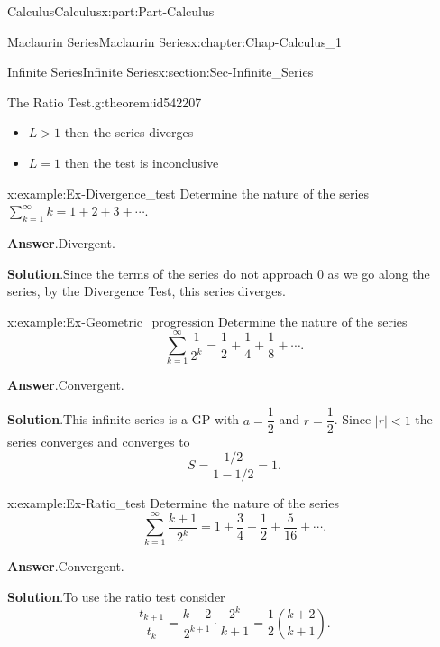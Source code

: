 \documentclass[oneside,10pt,]{book}
\newcommand{\blocktitlefont}{\relax}
\numberwithin{equation}{section}
\begin{document}
\begin{partptx}{Calculus}{}{Calculus}{}{}{x:part:Part-Calculus}
\begin{chapterptx}{Maclaurin Series}{}{Maclaurin Series}{}{}{x:chapter:Chap-Calculus_1}
\begin{sectionptx}{Infinite Series}{}{Infinite Series}{}{}{x:section:Sec-Infinite_Series}
\begin{theorem}{The Ratio Test.}{}{g:theorem:id542207}
\begin{itemize}[label=\textbullet]
\item{}\(L>1\) then the series diverges%
\item{}\(L=1\) then the test is inconclusive%
\end{itemize}
%
\end{theorem}
\begin{example}{}{x:example:Ex-Divergence_test}%
Determine the nature of the series  \(\displaystyle\sum_{k=1}^{\infty}k = 1+2+3+\cdots.\)%
\par\smallskip%
\noindent\textbf{\blocktitlefont Answer}.\hypertarget{g:answer:id542241}{}\quad{}Divergent.%
\par\smallskip%
\noindent\textbf{\blocktitlefont Solution}.\hypertarget{g:solution:id542265}{}\quad{}Since the terms of the series do not approach 0 as we go along the series, by the Divergence Test, this series diverges.%
\end{example}
\begin{example}{}{x:example:Ex-Geometric_progression}%
Determine the nature of the series%
\begin{equation*}
\sum_{k=1}^{\infty}\frac{1}{2^k} = \dfrac{1}{2}+\dfrac{1}{4}+\dfrac{1}{8}+\cdots.
\end{equation*}
%
\par\smallskip%
\noindent\textbf{\blocktitlefont Answer}.\hypertarget{g:answer:id542254}{}\quad{}Convergent.%
\par\smallskip%
\noindent\textbf{\blocktitlefont Solution}.\hypertarget{g:solution:id542273}{}\quad{}This infinite series is a GP with \(a=\dfrac{1}{2}\) and \(r=\dfrac{1}{2}\). Since \(|r|<1\) the series converges and converges to%
\begin{equation*}
S=\dfrac{1/2}{1-1/2} =1.
\end{equation*}
%
\end{example}
\begin{example}{}{x:example:Ex-Ratio_test}%
Determine the nature of the series%
\begin{equation*}
\sum_{k=1}^{\infty}\frac{k+1}{2^k} = 1+\dfrac{3}{4}+\dfrac{1}{2}+\dfrac{5}{16}+\cdots.
\end{equation*}
%
\par\smallskip%
\noindent\textbf{\blocktitlefont Answer}.\hypertarget{g:answer:id542314}{}\quad{}Convergent.%
\par\smallskip%
\noindent\textbf{\blocktitlefont Solution}.\hypertarget{g:solution:id542292}{}\quad{}To use the ratio test consider%
\begin{equation*}
\dfrac{t_{k+1}}{t_k} = \dfrac{k+2}{2^{k+1}}\cdot\dfrac{2^k}{k+1} = \dfrac{1}{2}\left(\dfrac{k+2}{k+1}\right).

\end{equation*}
\end{example}
\end{sectionptx}
\end{chapterptx}
\end{partptx}
\end{document}
